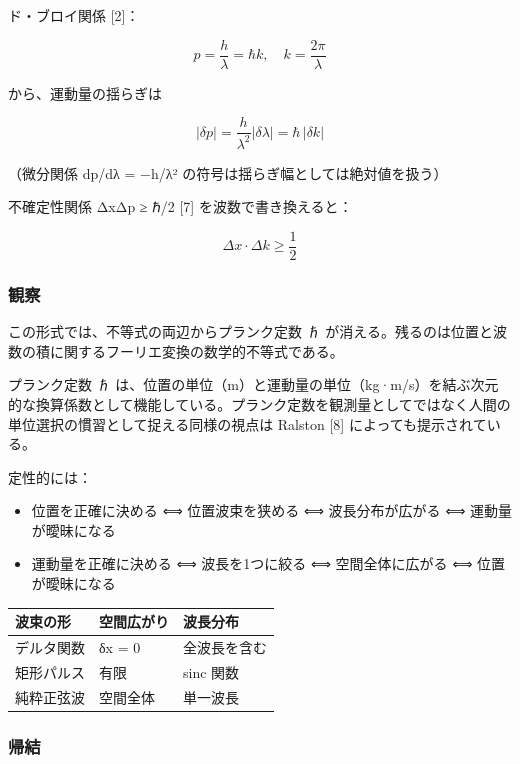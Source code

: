 \documentclass[
  11pt,
]{ltjsarticle}
\newcounter{none} %
\providecommand{\tightlist}{%
  \setlength{\itemsep}{0pt}\setlength{\parskip}{0pt}}
\begin{document}
ド・ブロイ関係 {[}2{]}：

\[p = \frac{h}{\lambda} = \hbar k, \quad k = \frac{2\pi}{\lambda}\]

から、運動量の揺らぎは

\[|\delta p| = \frac{h}{\lambda^2}|\delta\lambda| = \hbar \, |\delta k|\]

（微分関係 dp/dλ = −h/λ² の符号は揺らぎ幅としては絶対値を扱う）

不確定性関係 ΔxΔp ≥ ℏ/2 {[}7{]} を波数で書き換えると：

\[\Delta x \cdot \Delta k \geq \frac{1}{2}\]

\subsubsection{観察}\label{ux89b3ux5bdf}

この形式では、不等式の両辺からプランク定数 ℏ
が消える。残るのは位置と波数の積に関するフーリエ変換の数学的不等式である。

プランク定数 ℏ
は、位置の単位（m）と運動量の単位（kg·m/s）を結ぶ次元的な換算係数として機能している。プランク定数を観測量としてではなく人間の単位選択の慣習として捉える同様の視点は
Ralston {[}8{]} によっても提示されている。

定性的には：

\begin{itemize}
\tightlist
\item
  位置を正確に決める ⟺ 位置波束を狭める ⟺ 波長分布が広がる ⟺
  運動量が曖昧になる
\item
  運動量を正確に決める ⟺ 波長を1つに絞る ⟺ 空間全体に広がる ⟺
  位置が曖昧になる
\end{itemize}

{\def\LTcaptype{none} %
\begin{longtable}[]{@{}lll@{}}
\toprule\noalign{}
波束の形 & 空間広がり & 波長分布 \\
\midrule\noalign{}
\endhead
\bottomrule\noalign{}
\endlastfoot
デルタ関数 & δx = 0 & 全波長を含む \\
矩形パルス & 有限 & sinc 関数 \\
純粋正弦波 & 空間全体 & 単一波長 \\
\end{longtable}
}

\subsubsection{帰結}\label{ux5e30ux7d50-2}
\end{document}
